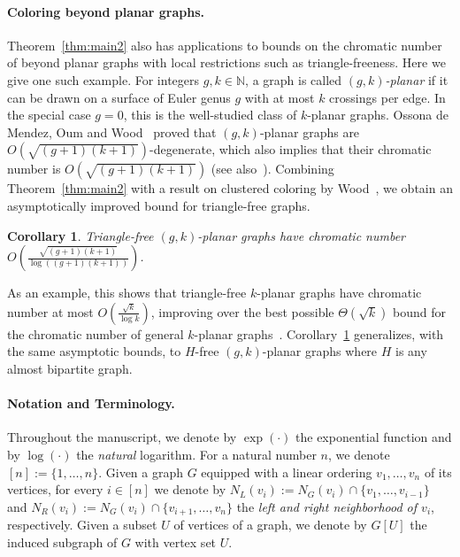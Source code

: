 \documentclass[10pt]{amsart}
\newtheorem{corollary}[theorem]{Corollary}
\theoremstyle{definition}
\begin{document}
\paragraph*{\textbf{Coloring beyond planar graphs.}} Theorem~\ref{thm:main2} also has applications to bounds on the chromatic number of beyond planar graphs with local restrictions such as triangle-freeness. Here we give one such example. For integers $g,k\in \mathbb{N}$, a graph is called \emph{$(g,k)$-planar} if it can be drawn on a surface of Euler genus $g$ with at most $k$ crossings per edge. In the special case $g=0$, this is the well-studied class of $k$-planar graphs. Ossona de Mendez, Oum and Wood~\cite{demendez} proved that $(g,k)$-planar graphs are $O(\sqrt{(g+1)(k+1)})$-degenerate, which also implies that their chromatic number is $O(\sqrt{(g+1)(k+1)})$ (see also~\cite{wood}). Combining Theorem~\ref{thm:main2} with a result on clustered coloring by Wood~\cite{wood}, we obtain an asymptotically improved bound for triangle-free graphs.
    \begin{corollary}\label{cor:gk}
   Triangle-free $(g,k)$-planar graphs have chromatic number $O\left(\frac{\sqrt{(g+1)(k+1)}}{\log ((g+1)(k+1))}\right)$.
    \end{corollary}
    As an example, this shows that triangle-free $k$-planar graphs have chromatic number at most $O(\frac{\sqrt{k}}{\log k})$, improving over the best possible $\Theta(\sqrt{k})$ bound for the chromatic number of general $k$-planar graphs~\cite{pach}. Corollary~\ref{cor:gk} generalizes, with the same asymptotic bounds, to $H$-free $(g,k)$-planar graphs where $H$ is any almost bipartite graph.

\medskip

\paragraph*{\textbf{Notation and Terminology.}}
Throughout the manuscript, we denote by $\exp(\cdot)$ the exponential function and by $\log(\cdot)$ the \emph{natural} logarithm. For a natural number $n$, we denote $[n]:=\{1,\ldots,n\}$. Given a graph $G$ equipped with a linear ordering $v_1,\ldots,v_n$ of its vertices, for every $i\in [n]$ we denote by $N_L(v_i):=N_G(v_i)\cap \{v_1,\ldots,v_{i-1}\}$  and $N_R(v_i):=N_G(v_i)\cap \{v_{i+1},\ldots,v_n\}$ the \emph{left and right neighborhood of $v_i$}, respectively. Given a subset $U$ of vertices of a graph, we denote by $G[U]$ the induced subgraph of $G$ with vertex set $U$. 
\end{document}
